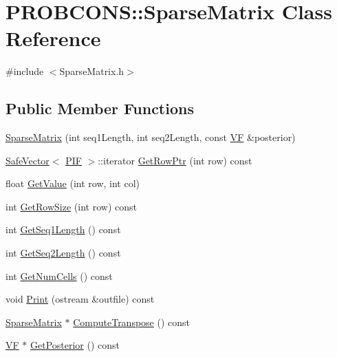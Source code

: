 \hypertarget{class_p_r_o_b_c_o_n_s_1_1_sparse_matrix}{\section{P\+R\+O\+B\+C\+O\+N\+S\+:\+:Sparse\+Matrix Class Reference}
\label{class_p_r_o_b_c_o_n_s_1_1_sparse_matrix}
}


{\ttfamily \#include $<$Sparse\+Matrix.\+h$>$}

\subsection*{Public Member Functions}
\begin{DoxyCompactItemize}
\item 
\hyperlink{class_p_r_o_b_c_o_n_s_1_1_sparse_matrix_ada05eaa254699e1e20941d15f04aa348}{Sparse\+Matrix} (int seq1\+Length, int seq2\+Length, const \hyperlink{namespace_p_r_o_b_c_o_n_s_a7d46b91dfef3fa4038545a492ad12221}{V\+F} \&posterior)
\item 
\hyperlink{class_p_r_o_b_c_o_n_s_1_1_safe_vector}{Safe\+Vector}$<$ \hyperlink{namespace_p_r_o_b_c_o_n_s_a397767dfc075ae6ba7e480f5f06edc32}{P\+I\+F} $>$\+::iterator \hyperlink{class_p_r_o_b_c_o_n_s_1_1_sparse_matrix_a0e2b031451f16e055ef3c9baf220d2ae}{Get\+Row\+Ptr} (int row) const 
\item 
float \hyperlink{class_p_r_o_b_c_o_n_s_1_1_sparse_matrix_a7a545fa7ccef54cd950196c0477c9ed9}{Get\+Value} (int row, int col)
\item 
int \hyperlink{class_p_r_o_b_c_o_n_s_1_1_sparse_matrix_abb1a773a3916f935ad103dadd0604cd6}{Get\+Row\+Size} (int row) const 
\item 
int \hyperlink{class_p_r_o_b_c_o_n_s_1_1_sparse_matrix_a5cec4ef85573e6c588181ac24c056155}{Get\+Seq1\+Length} () const 
\item 
int \hyperlink{class_p_r_o_b_c_o_n_s_1_1_sparse_matrix_a27045646a4f692e2fc7427767fbbcb21}{Get\+Seq2\+Length} () const 
\item 
int \hyperlink{class_p_r_o_b_c_o_n_s_1_1_sparse_matrix_a589980a6897476bd527554fc5c2cfbd1}{Get\+Num\+Cells} () const 
\item 
void \hyperlink{class_p_r_o_b_c_o_n_s_1_1_sparse_matrix_a6b6c625bd5965b8557235b383b8fa661}{Print} (ostream \&outfile) const 
\item 
\hyperlink{class_p_r_o_b_c_o_n_s_1_1_sparse_matrix}{Sparse\+Matrix} $\ast$ \hyperlink{class_p_r_o_b_c_o_n_s_1_1_sparse_matrix_a3a6545a946df758a37c29a8ffd987cdd}{Compute\+Transpose} () const 
\item 
\hyperlink{namespace_p_r_o_b_c_o_n_s_a7d46b91dfef3fa4038545a492ad12221}{V\+F} $\ast$ \hyperlink{class_p_r_o_b_c_o_n_s_1_1_sparse_matrix_a0b0f6be9a5761daee30526ce7c470187}{Get\+Posterior} () const 
\end{DoxyCompactItemize}


